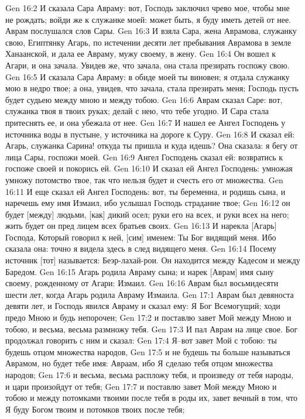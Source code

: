 Gen 16:2  И сказала Сара Авраму: вот, Господь заключил чрево мое, чтобы мне не рождать; войди же к служанке моей: может быть, я буду иметь детей от нее. Аврам послушался слов Сары.
Gen 16:3  И взяла Сара, жена Аврамова, служанку свою, Египтянку Агарь, по истечении десяти лет пребывания Аврамова в земле Ханаанской, и дала ее Авраму, мужу своему, в жену.
Gen 16:4  Он вошел к Агари, и она зачала. Увидев же, что зачала, она стала презирать госпожу свою.
Gen 16:5  И сказала Сара Авраму: в обиде моей ты виновен; я отдала служанку мою в недро твое; а она, увидев, что зачала, стала презирать меня; Господь пусть будет судьею между мною и между тобою.
Gen 16:6  Аврам сказал Саре: вот, служанка твоя в твоих руках; делай с нею, что тебе угодно. И Сара стала притеснять ее, и она убежала от нее.
Gen 16:7  И нашел ее Ангел Господень у источника воды в пустыне, у источника на дороге к Суру.
Gen 16:8  И сказал ей: Агарь, служанка Сарина! откуда ты пришла и куда идешь? Она сказала: я бегу от лица Сары, госпожи моей.
Gen 16:9  Ангел Господень сказал ей: возвратись к госпоже своей и покорись ей.
Gen 16:10  И сказал ей Ангел Господень: умножая умножу потомство твое, так что нельзя будет и счесть его от множества.
Gen 16:11  И еще сказал ей Ангел Господень: вот, ты беременна, и родишь сына, и наречешь ему имя Измаил, ибо услышал Господь страдание твое;
Gen 16:12  он будет [между] людьми, [как] дикий осел; руки его на всех, и руки всех на него; жить будет он пред лицем всех братьев своих.
Gen 16:13  И нарекла [Агарь] Господа, Который говорил к ней, [сим] именем: Ты Бог видящий меня. Ибо сказала она: точно я видела здесь в след видящего меня.
Gen 16:14  Посему источник [тот] называется: Беэр-лахай-рои. Он находится между Кадесом и между Баредом.
Gen 16:15  Агарь родила Авраму сына; и нарек [Аврам] имя сыну своему, рожденному от Агари: Измаил.
Gen 16:16  Аврам был восьмидесяти шести лет, когда Агарь родила Авраму Измаила.
Gen 17:1  Аврам был девяноста девяти лет, и Господь явился Авраму и сказал ему: Я Бог Всемогущий; ходи предо Мною и будь непорочен;
Gen 17:2  и поставлю завет Мой между Мною и тобою, и весьма, весьма размножу тебя.
Gen 17:3  И пал Аврам на лице свое. Бог продолжал говорить с ним и сказал:
Gen 17:4  Я--вот завет Мой с тобою: ты будешь отцом множества народов,
Gen 17:5  и не будешь ты больше называться Аврамом, но будет тебе имя: Авраам, ибо Я сделаю тебя отцом множества народов;
Gen 17:6  и весьма, весьма распложу тебя, и произведу от тебя народы, и цари произойдут от тебя;
Gen 17:7  и поставлю завет Мой между Мною и тобою и между потомками твоими после тебя в роды их, завет вечный в том, что Я буду Богом твоим и потомков твоих после тебя;
